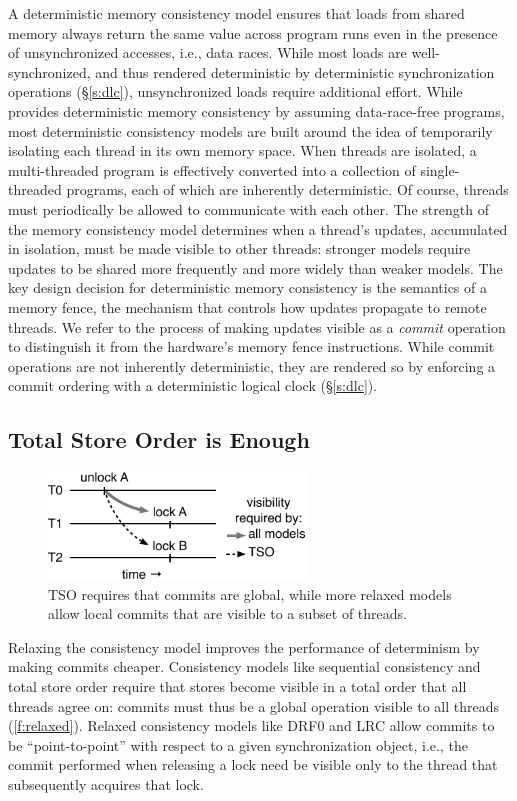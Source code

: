 A deterministic memory consistency model ensures that loads from shared memory always return the same value across program runs even in the presence of unsynchronized accesses, i.e., data races. While most loads are well-synchronized, and thus rendered deterministic by deterministic synchronization operations (\S\ref{s:dlc}), unsynchronized loads require additional effort. While \cite{olszewski_kendo:_2009} provides deterministic memory consistency by assuming data-race-free programs, most deterministic consistency models are built around the idea of temporarily isolating each thread in its own memory space. When threads are isolated, a multi-threaded program is effectively converted into a collection of single-threaded programs, each of which are inherently deterministic. Of course, threads must periodically be allowed to communicate with each other. The strength of the memory consistency model determines when a thread's updates, accumulated in isolation, must be made visible to other threads: stronger models require updates to be shared more frequently and more widely than weaker models. The key design decision for deterministic memory consistency is the semantics of a memory fence, the mechanism that controls how updates propagate to remote threads. We refer to the process of making updates visible as a \emph{commit} operation to distinguish it from the hardware's memory fence instructions. While commit operations are not inherently deterministic, they are rendered so by enforcing a commit ordering with a deterministic logical clock (\S\ref{s:dlc}).

\subsection{Total Store Order is Enough}

\begin{figure}
\centering
\includegraphics[width=2.7in]{figures/relaxed-consistency.pdf}
\caption{TSO requires that commits are global, while more relaxed models allow local commits that are visible to a subset of threads.}
\label{f:relaxed}
\end{figure}

Relaxing the consistency model improves the performance of determinism by making commits cheaper. Consistency models like sequential consistency and total store order require that stores become visible in a total order that all threads agree on: commits must thus be a global operation visible to all threads (\autoref{f:relaxed}). Relaxed consistency models like DRF0 \cite{devietti_rcdc:_2011} and LRC \cite{kai_lu_efficient_2014} allow commits to be ``point-to-point'' with respect to a given synchronization object, i.e., the commit performed when releasing a lock need be visible only to the thread that subsequently acquires that lock.

